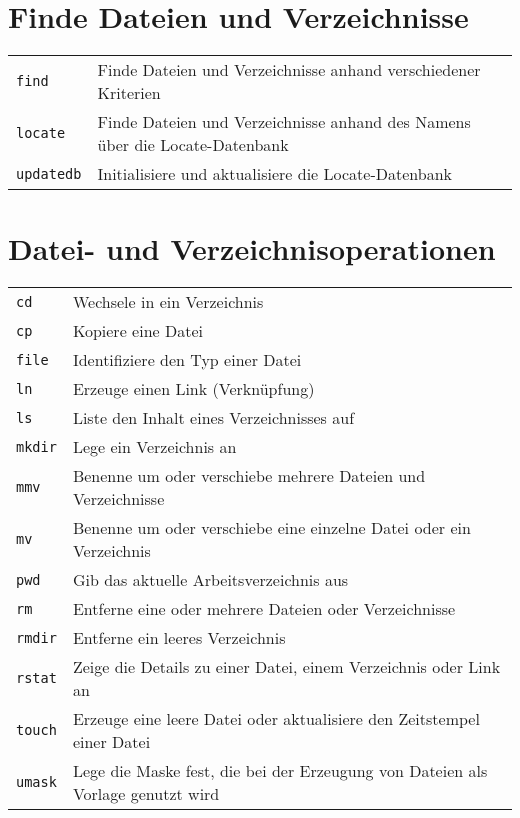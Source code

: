 \documentclass[10pt,a4paper]{article}
\begin{document}
\begin{multicols}{2}
\vfill

\section{Finde Dateien und Verzeichnisse}
\begin{tabular}{ p{2.5cm} p{8.5cm} }
  \hline
  \texttt{find} & Finde Dateien und Verzeichnisse anhand \newline verschiedener Kriterien \\
  \rowcolor{Gray}
  \texttt{locate} & Finde Dateien und Verzeichnisse anhand des Namens über die Locate-Datenbank \\
  \texttt{updatedb} & Initialisiere und aktualisiere die Locate-Datenbank \\
  \hline
\end{tabular}

\columnbreak

\section{Datei- und Verzeichnisoperationen}
\begin{tabular}{ p{2.5cm} p{8.5cm} }
  \hline
  \texttt{cd} & Wechsele in ein Verzeichnis \\
  \rowcolor{Gray}
  \texttt{cp} & Kopiere eine Datei \\
  \texttt{file} & Identifiziere den Typ einer Datei\\
  \rowcolor{Gray}
  \texttt{ln} & Erzeuge einen Link (Verknüpfung) \\
  \texttt{ls} & Liste den Inhalt eines Verzeichnisses auf \\
  \rowcolor{Gray}
  \texttt{mkdir} & Lege ein Verzeichnis an\\
  \texttt{mmv} & Benenne um oder verschiebe mehrere Dateien und Verzeichnisse \\
  \rowcolor{Gray}
  \texttt{mv} & Benenne um oder verschiebe eine einzelne Datei oder ein Verzeichnis \\
  \texttt{pwd} & Gib das aktuelle Arbeitsverzeichnis aus \\
  \rowcolor{Gray}
  \texttt{rm} & Entferne eine oder mehrere Dateien oder Verzeichnisse \\
  \texttt{rmdir} & Entferne ein leeres Verzeichnis \\
  \rowcolor{Gray}
  \texttt{rstat} & Zeige die Details zu einer Datei, einem Verzeichnis oder Link an \\
  \texttt{touch} & Erzeuge eine leere Datei oder aktualisiere den Zeitstempel einer Datei \\
  \rowcolor{Gray}
  \texttt{umask} & Lege die Maske fest, die bei der Erzeugung von Dateien als Vorlage genutzt wird \\
  \hline
\end{tabular}


\end{multicols}
\end{document}
